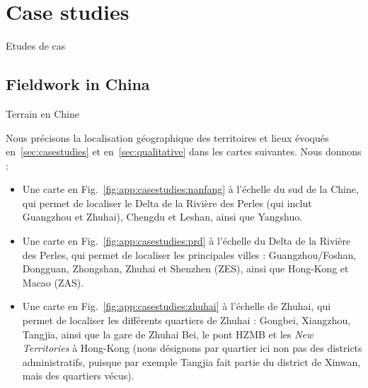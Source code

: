 



\newpage

\section{Case studies}{Etudes de cas}

\label{app:sec:casestudies}



\subsection{Fieldwork in China}{Terrain en Chine}


Nous précisons la localisation géographique des territoires et lieux évoqués en~\ref{sec:casestudies} et en~\ref{sec:qualitative} dans les cartes suivantes. Nous donnons :
\begin{itemize}
	\item Une carte en Fig.~\ref{fig:app:casestudies:nanfang} à l'échelle du sud de la Chine, qui permet de localiser le Delta de la Rivière des Perles (qui inclut Guangzhou et Zhuhai), Chengdu et Leshan, ainsi que Yangshuo.
	\item Une carte en Fig.~\ref{fig:app:casestudies:prd} à l'échelle du Delta de la Rivière des Perles, qui permet de localiser les principales villes : Guangzhou/Foshan, Dongguan, Zhongshan, Zhuhai et Shenzhen (ZES), ainsi que Hong-Kong et Macao (ZAS).
	\item Une carte en Fig.~\ref{fig:app:casestudies:zhuhai} à l'échelle de Zhuhai, qui permet de localiser les différents quartiers de Zhuhai : Gongbei, Xiangzhou, Tangjia, ainsi que la gare de Zhuhai Bei, le pont HZMB et les \emph{New Territories} à Hong-Kong (nous désignons par quartier ici non pas des districts administratifs, puisque par exemple Tangjia fait partie du district de Xinwan, mais des quartiers vécus).
\end{itemize}



